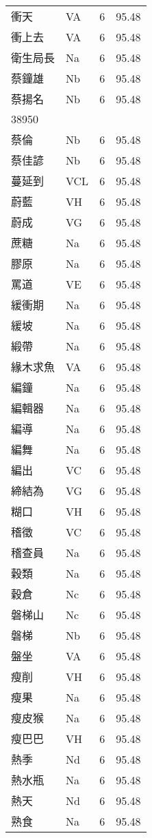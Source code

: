 \documentclass[twocolumn]{book}
\begin{document}
\begin{supertabular}{llrr}
衝天 & VA & 6 &  95.48\\
衝上去 & VA & 6 &  95.48\\
衛生局長 & Na & 6 &  95.48\\
蔡鐘雄 & Nb & 6 &  95.48\\
蔡揚名 & Nb & 6 &  95.48\\
38950\\
蔡倫 & Nb & 6 &  95.48\\
蔡佳諺 & Nb & 6 &  95.48\\
蔓延到 & VCL & 6 &  95.48\\
蔚藍 & VH & 6 &  95.48\\
蔚成 & VG & 6 &  95.48\\
蔗糖 & Na & 6 &  95.48\\
膠原 & Na & 6 &  95.48\\
罵道 & VE & 6 &  95.48\\
緩衝期 & Na & 6 &  95.48\\
緩坡 & Na & 6 &  95.48\\
緞帶 & Na & 6 &  95.48\\
緣木求魚 & VA & 6 &  95.48\\
編鐘 & Na & 6 &  95.48\\
編輯器 & Na & 6 &  95.48\\
編導 & Na & 6 &  95.48\\
編舞 & Na & 6 &  95.48\\
編出 & VC & 6 &  95.48\\
締結為 & VG & 6 &  95.48\\
糊口 & VH & 6 &  95.48\\
稽徵 & VC & 6 &  95.48\\
稽查員 & Na & 6 &  95.48\\
穀類 & Na & 6 &  95.48\\
穀倉 & Nc & 6 &  95.48\\
磐梯山 & Nc & 6 &  95.48\\
磐梯 & Nb & 6 &  95.48\\
盤坐 & VA & 6 &  95.48\\
瘦削 & VH & 6 &  95.48\\
瘦果 & Na & 6 &  95.48\\
瘦皮猴 & Na & 6 &  95.48\\
瘦巴巴 & VH & 6 &  95.48\\
熱季 & Nd & 6 &  95.48\\
熱水瓶 & Na & 6 &  95.48\\
熱天 & Nd & 6 &  95.48\\
熟食 & Na & 6 &  95.48\\

\end{supertabular}
\end{document}
